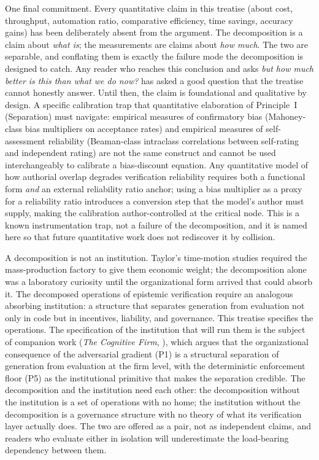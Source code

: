 \documentclass[11pt]{article}
\begin{document}
One final commitment. Every quantitative claim in this treatise (about cost, throughput, automation ratio, comparative efficiency, time savings, accuracy gains) has been deliberately absent from the argument. The decomposition is a claim about \emph{what is}; the measurements are claims about \emph{how much}. The two are separable, and conflating them is exactly the failure mode the decomposition is designed to catch. Any reader who reaches this conclusion and asks \emph{but how much better is this than what we do now?} has asked a good question that the treatise cannot honestly answer. Until then, the claim is foundational and qualitative by design. A specific calibration trap that quantitative elaboration of Principle~I (Separation) must navigate: empirical measures of confirmatory bias (Mahoney-class bias multipliers on acceptance rates) and empirical measures of self-assessment reliability (Beaman-class intraclass correlations between self-rating and independent rating) are not the same construct and cannot be used interchangeably to calibrate a bias-discount equation. Any quantitative model of how authorial overlap degrades verification reliability requires both a functional form \emph{and} an external reliability ratio anchor; using a bias multiplier as a proxy for a reliability ratio introduces a conversion step that the model's author must supply, making the calibration author-controlled at the critical node. This is a known instrumentation trap, not a failure of the decomposition, and it is named here so that future quantitative work does not rediscover it by collision.

A decomposition is not an institution. Taylor's time-motion studies required the mass-production factory to give them economic weight; the decomposition alone was a laboratory curiosity until the organizational form arrived that could absorb it. The decomposed operations of epistemic verification require an analogous absorbing institution: a structure that separates generation from evaluation not only in code but in incentives, liability, and governance. This treatise specifies the operations. The specification of the institution that will run them is the subject of companion work (\emph{The Cognitive Firm}, \citealt{alami2026b}), which argues that the organizational consequence of the adversarial gradient (P1) is a structural separation of generation from evaluation at the firm level, with the deterministic enforcement floor (P5) as the institutional primitive that makes the separation credible. The decomposition and the institution need each other: the decomposition without the institution is a set of operations with no home; the institution without the decomposition is a governance structure with no theory of what its verification layer actually does. The two are offered as a pair, not as independent claims, and readers who evaluate either in isolation will underestimate the load-bearing dependency between them.
\end{document}

